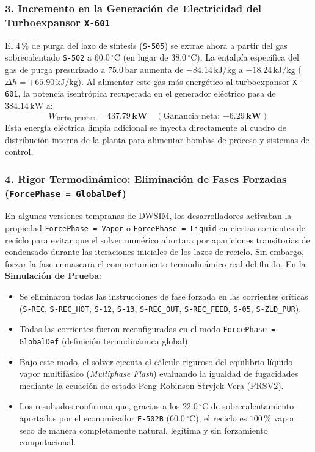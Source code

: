 \documentclass[11pt,a4paper]{article}
\begin{document}
\subsubsection{3. Incremento en la Generación de Electricidad del Turboexpansor \texttt{X-601}}
El $4\,\%$ de purga del lazo de síntesis (\texttt{S-505}) se extrae ahora a partir del gas sobrecalentado \texttt{S-502} a $60.0\,^\circ\text{C}$ (en lugar de $38.0\,^\circ\text{C}$).
La entalpía específica del gas de purga presurizado a $75.0\,\text{bar}$ aumenta de $-84.14\,\text{kJ/kg}$ a $-18.24\,\text{kJ/kg}$ ($\Delta h = +65.90\,\text{kJ/kg}$).
Al alimentar este gas más energético al turboexpansor \texttt{X-601}, la potencia isentrópica recuperada en el generador eléctrico pasa de $384.14\,\text{kW}$ a:
\begin{equation}
    W_{\text{turbo, pruebas}} = \mathbf{437.79\,\text{kW}} \quad (\text{Ganancia neta: } \mathbf{+6.29\,\text{kW}})
\end{equation}
Esta energía eléctrica limpia adicional se inyecta directamente al cuadro de distribución interna de la planta para alimentar bombas de proceso y sistemas de control.

\subsubsection{4. Rigor Termodinámico: Eliminación de Fases Forzadas (\texttt{ForcePhase = GlobalDef})}
En algunas versiones tempranas de DWSIM, los desarrolladores activaban la propiedad \texttt{ForcePhase = Vapor} o \texttt{ForcePhase = Liquid} en ciertas corrientes de reciclo para evitar que el solver numérico abortara por apariciones transitorias de condensado durante las iteraciones iniciales de los lazos de reciclo.
Sin embargo, forzar la fase enmascara el comportamiento termodinámico real del fluido. En la \textbf{Simulación de Prueba}:
\begin{itemize}
    \item Se eliminaron todas las instrucciones de fase forzada en las corrientes críticas (\texttt{S-REC}, \texttt{S-REC\_HOT}, \texttt{S-12}, \texttt{S-13}, \texttt{S-REC\_OUT}, \texttt{S-REC\_FEED}, \texttt{S-05}, \texttt{S-ZLD\_PUR}).
    \item Todas las corrientes fueron reconfiguradas en el modo \texttt{ForcePhase = GlobalDef} (definición termodinámica global).
    \item Bajo este modo, el solver ejecuta el cálculo riguroso del equilibrio líquido-vapor multifásico (\textit{Multiphase Flash}) evaluando la igualdad de fugacidades mediante la ecuación de estado Peng-Robinson-Stryjek-Vera (PRSV2).
    \item Los resultados confirman que, gracias a los $22.0\,^\circ\text{C}$ de sobrecalentamiento aportados por el economizador \texttt{E-502B} ($60.0\,^\circ\text{C}$), el reciclo es $100\,\%$ vapor seco de manera completamente natural, legítima y sin forzamiento computacional.
\end{itemize}
\end{document}
